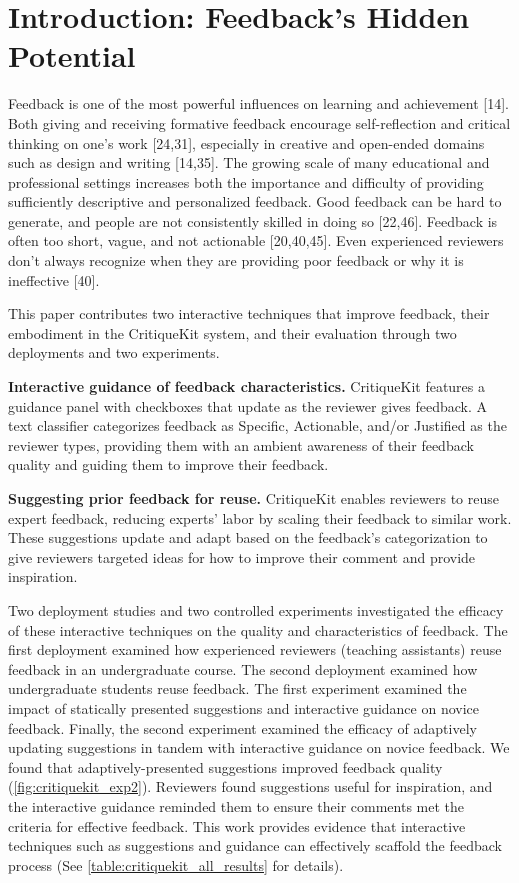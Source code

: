 \section{Introduction: Feedback's Hidden Potential}
Feedback is one of the most powerful influences on learning and achievement [14]. Both giving and receiving formative feedback encourage self-reflection and critical thinking on one's work [24,31], especially in creative and open-ended domains such as design and writing [14,35]. The growing scale of many educational and professional settings increases both the importance and difficulty of providing sufficiently descriptive and personalized feedback. Good feedback can be hard to generate, and people are not consistently skilled in doing so [22,46]. Feedback is often too short, vague, and not actionable [20,40,45]. Even experienced reviewers don't always recognize when they are providing poor feedback or why it is ineffective [40].

This paper contributes two interactive techniques that improve feedback, their embodiment in the CritiqueKit system, and their evaluation through two deployments and two experiments.

\textbf{Interactive guidance of feedback characteristics.} CritiqueKit features a guidance panel with checkboxes that update as the reviewer gives feedback. A text classifier categorizes feedback as Specific, Actionable, and/or Justified as the reviewer types, providing them with an ambient awareness of their feedback quality and guiding them to improve their feedback. 

\textbf{Suggesting prior feedback for reuse.} CritiqueKit enables reviewers to reuse expert feedback, reducing experts' labor by scaling their feedback to similar work. These suggestions update and adapt based on the feedback's categorization to give reviewers targeted ideas for how to improve their comment and provide inspiration. 

Two deployment studies and two controlled experiments investigated the efficacy of these interactive techniques on the quality and characteristics of feedback. The first deployment examined how experienced reviewers (teaching assistants) reuse feedback in an undergraduate course. The second deployment examined how undergraduate students reuse feedback. The first experiment examined the impact of statically presented suggestions and interactive guidance on novice feedback. Finally, the second experiment examined the efficacy of adaptively updating suggestions in tandem with interactive guidance on novice feedback. We found that adaptively-presented suggestions improved feedback quality (\autoref{fig:critiquekit_exp2}). Reviewers found suggestions useful for inspiration, and the interactive guidance reminded them to ensure their comments met the criteria for effective feedback. This work provides evidence that interactive techniques such as suggestions and guidance can effectively scaffold the feedback process (See \autoref{table:critiquekit_all_results} for details).

